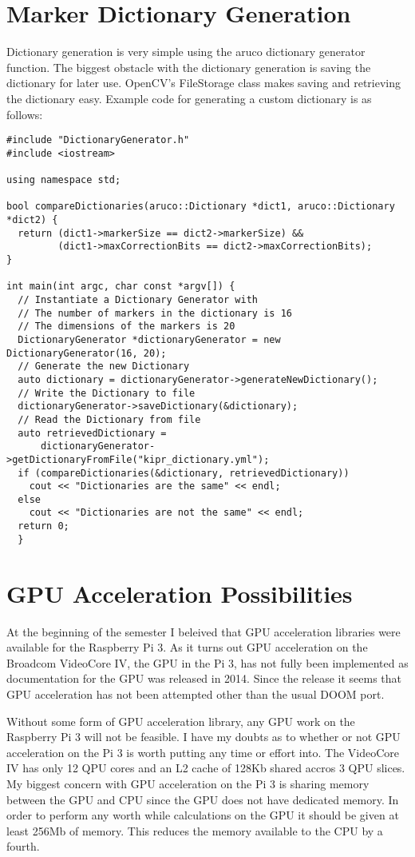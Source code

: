 \documentclass[twoside]{report}
\begin{document}
  \section{Marker Dictionary Generation}
  Dictionary generation is very simple using the aruco dictionary generator function.
  The biggest obstacle with the dictionary generation is saving the dictionary for
  later use. OpenCV's FileStorage class makes saving and retrieving the dictionary
  easy.  Example code for generating a custom dictionary is as follows:
  \begin{lstlisting}
#include "DictionaryGenerator.h"
#include <iostream>

using namespace std;

bool compareDictionaries(aruco::Dictionary *dict1, aruco::Dictionary *dict2) {
  return (dict1->markerSize == dict2->markerSize) &&
         (dict1->maxCorrectionBits == dict2->maxCorrectionBits);
}

int main(int argc, char const *argv[]) {
  // Instantiate a Dictionary Generator with
  // The number of markers in the dictionary is 16
  // The dimensions of the markers is 20
  DictionaryGenerator *dictionaryGenerator = new DictionaryGenerator(16, 20);
  // Generate the new Dictionary
  auto dictionary = dictionaryGenerator->generateNewDictionary();
  // Write the Dictionary to file
  dictionaryGenerator->saveDictionary(&dictionary);
  // Read the Dictionary from file
  auto retrievedDictionary =
      dictionaryGenerator->getDictionaryFromFile("kipr_dictionary.yml");
  if (compareDictionaries(&dictionary, retrievedDictionary))
    cout << "Dictionaries are the same" << endl;
  else
    cout << "Dictionaries are not the same" << endl;
  return 0;
  }
  \end{lstlisting}
  \section{GPU Acceleration Possibilities}
  At the beginning of the semester I beleived that GPU acceleration libraries
  were available for the Raspberry Pi 3.  As it turns out GPU acceleration on the
  Broadcom VideoCore IV, the GPU in the Pi 3, has not fully been implemented as
  documentation for the GPU was released in 2014. Since the release it seems that
  GPU acceleration has not been attempted other than the usual DOOM port.

  Without some form of GPU acceleration library, any GPU work on the Raspberry Pi
  3 will not be feasible. I have my doubts as to whether or not GPU acceleration
  on the Pi 3 is worth putting any time or effort into.  The VideoCore IV has only
  12 QPU cores and an L2 cache of 128Kb shared accros 3 QPU slices. My biggest
  concern with GPU acceleration on the Pi 3 is sharing memory between the GPU and
  CPU since the GPU does not have dedicated memory. In order to perform any worth
  while calculations on the GPU it should be given at least 256Mb of memory.  This
  reduces the memory available to the CPU by a fourth.
\end{document}
